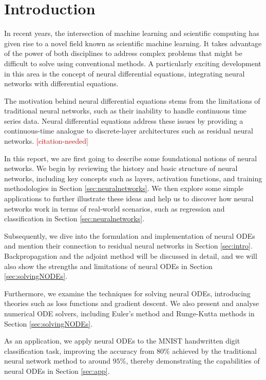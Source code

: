\documentclass[a4paper,11pt,titlepage]{article}
\newcommand{\citationneeded}{\textcolor{red}{[citation-needed]}}
\theoremstyle{definition}
\theoremstyle{plain}
\theoremstyle{remark}
\begin{document}
\section{Introduction}

In recent years, the intersection of machine learning and scientific computing has given rise to a novel field known as scientific machine learning. It takes advantage of the power of both disciplines to address complex problems that might be difficult to solve using conventional methods. A particularly exciting development in this area is the concept of neural differential equations, integrating neural networks with differential equations. \cite{chen2018neural}

The motivation behind neural differential equations stems from the limitations of traditional neural networks, such as their inability to handle continuous time series data. Neural differential equations address these issues by providing a continuous-time analogue to discrete-layer architectures such as residual neural networks. \citationneeded

In this report, we are first going to describe some foundational notions of neural networks. We begin by reviewing the history and basic structure of neural networks, including key concepts such as layers, activation functions, and training methodologies in Section \ref{sec:neuralnetworks}. We then explore some simple applications to further illustrate these ideas and help us to discover how neural networks work in terms of real-world scenarios, such as regression and classification in Section \ref{sec:neuralnetworks}.

Subsequently, we dive into the formulation and implementation of neural ODEs and mention their connection to residual neural networks in Section \ref{sec:intro}. Backpropagation and the adjoint method will be discussed in detail, and we will also show the strengths and limitations of neural ODEs in Section \ref{sec:solvingNODEs}.

Furthermore, we examine the techniques for solving neural ODEs, introducing theories such as loss functions and gradient descent. We also present and analyse numerical ODE solvers, including Euler's method and Runge-Kutta methods in Section \ref{sec:solvingNODEs}.

As an application, we apply neural ODEs to the MNIST handwritten digit classification task, improving the accuracy from $80\%$ achieved by the traditional neural network method to around $95\%$, thereby demonstrating the capabilities of neural ODEs in Section \ref{sec:app}.
\end{document}
